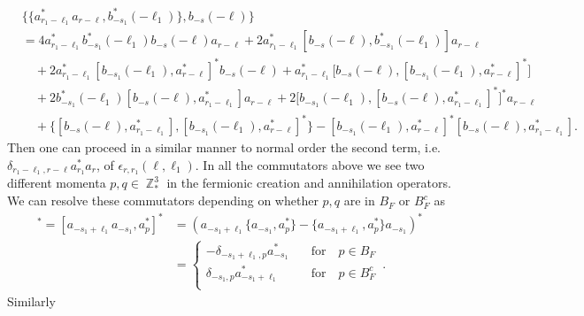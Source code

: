 \documentclass[sn-mathphys, Numbered ,a4paper]{sn-jnl}%
\DeclareMathOperator{\Z}{\mathbb{Z}}
\theoremstyle{plain}
\theoremstyle{definition}
\theoremstyle{remark}
\theoremstyle{plain}
\theoremstyle{definition}
\theoremstyle{remark}
\begin{document}
\begin{align}
    &\big\{\{a^*_{r_1-\ell_1}a_{r-\ell}, b^*_{-s_1}(-\ell_1)\},b_{-s}(-\ell)\big\}\nonumber\\
    &= 4a^*_{  r_1-\ell_1}b^*_{-s_1}(-\ell_1)b_{-s}(-\ell)a_{ r-\ell} + 2a^*_{  r_1-\ell_1}[b_{-s}(-\ell),b^*_{-s_1}(-\ell_1)]a_{ r-\ell}\nonumber\\ 
    &\quad + 2a^*_{r_1-\ell_1}[b_{-s_1}(-\ell_1),a^*_{ r-\ell}]^*b_{-s}(-\ell) + a^*_{  r_1-\ell_1}\big[b_{-s}(-\ell),[b_{-s_1}(-\ell_1),a^*_{ r-\ell}]^*\big]\nonumber\\
    &\quad + 2b^*_{-s_1}(-\ell_1)[b_{-s}(-\ell),a^*_{  r_1-\ell_1}]a_{ r-\ell} +2\big[b_{-s_1}(-\ell_1),[b_{-s}(-\ell),a^*_{  r_1-\ell_1}]^*\big]^*a_{ r-\ell}\nonumber\\
    &\quad + \big\{ [b_{-s}(-\ell),a^*_{  r_1-\ell_1}],[b_{-s_1}(-\ell_1), a^*_{ r-\ell}]^* \big\} - [ b_{-s_1}(-\ell_1), a^*_{ r-\ell}]^* [b_{-s}(-\ell), a^*_{r_1-\ell_1}].\label{eq:no2comm}
\end{align}
Then one can proceed in a similar manner to normal order the second term, i.e. $\delta_{r_1-\ell_1,r-\ell}a^*_{r_1}a_{r}$, of $\epsilon_{r,r_1}(\ell, \ell_1)$. In all the commutators above we see two different momenta $p,q \in \Z^3_*$ in the fermionic creation and annihilation operators. We can resolve these commutators depending on whether $p,q$ are in $B_{F}$ or $B_{F}^c$ as 
\begin{align}
	[b_{-s_1}(-\ell_1), a^*_{p}]^* = [a_{-s_1+\ell_1}a_{-s_1}, a^*_{p}]^* &=\left(a_{-s_1+\ell_1}\{a_{-s_1}, a^*_{p}\}-\{a_{-s_1+\ell_1}, a^*_{p}\}a_{-s_1} \right)^*\nonumber\\ 
	&=\begin{cases}
		-\delta_{-s_1+\ell_1,p}a^*_{-s_1} \quad&\text{for}\quad p \in B_F\\
		\delta_{-s_1,p}a^*_{-s_1+\ell_1} \quad&\text{for}\quad p \in B^c_F\\
	\end{cases}\label{eq:comm1}\,.
\end{align}
Similarly
\end{document}
